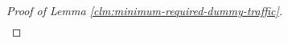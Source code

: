 \begin{proof}[Proof of Lemma \ref{clm:minimum-required-dummy-traffic}]
\begin{align*}
\end{align*}
\end{proof}


